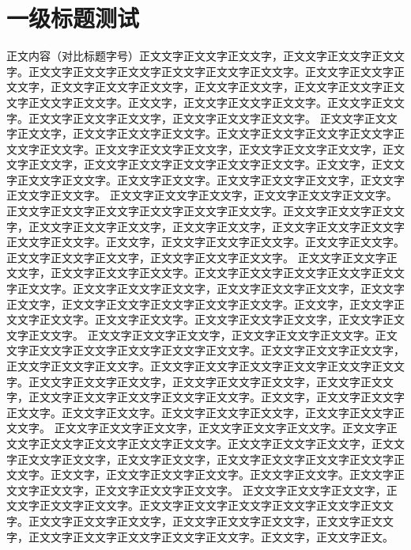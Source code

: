 
\section{一级标题测试}
正文内容（对比标题字号）\cite{6295193}正文文字正文文字正文文字，正文文字正文文字正文文字。正文文字正文文字正文文字正文文字正文文字正文文字。正文文字正文文字正文文字，正文文字正文文字正文文字，正文文字正文文字，正文文字正文文字正文文字正文文字正文文字。正文文字，正文文字正文文字正文文字。正文文字正文文字。正文文字正文文字正文文字，正文文字正文文字正文文字。
正文文字正文文字正文文字，正文文字正文文字正文文字。正文文字正文文字正文文字正文文字正文文字正文文字。正文文字正文文字正文文字，正文文字正文文字正文文字，正文文字正文文字，正文文字正文文字正文文字正文文字正文文字。正文文字，正文文字正文文字正文文字。正文文字正文文字。正文文字正文文字正文文字，正文文字正文文字正文文字。
正文文字正文文字正文文字，正文文字正文文字正文文字。正文文字正文文字正文文字正文文字正文文字正文文字。正文文字正文文字正文文字，正文文字正文文字正文文字，正文文字正文文字，正文文字正文文字正文文字正文文字正文文字。正文文字，正文文字正文文字正文文字。正文文字正文文字。正文文字正文文字正文文字，正文文字正文文字正文文字。
正文文字正文文字正文文字，正文文字正文文字正文文字。正文文字正文文字正文文字正文文字正文文字正文文字。正文文字正文文字正文文字，正文文字正文文字正文文字，正文文字正文文字，正文文字正文文字正文文字正文文字正文文字。正文文字，正文文字正文文字正文文字。正文文字正文文字。正文文字正文文字正文文字，正文文字正文文字正文文字。
正文文字正文文字正文文字，正文文字正文文字正文文字。正文文字正文文字正文文字正文文字正文文字正文文字。正文文字正文文字正文文字，正文文字正文文字正文文字。正文文字正文文字正文文字正文文字正文文字正文文字。正文文字正文文字正文文字，正文文字正文文字正文文字，正文文字正文文字，正文文字正文文字正文文字正文文字正文文字。正文文字，正文文字正文文字正文文字。正文文字正文文字。正文文字正文文字正文文字，正文文字正文文字正文文字。
正文文字正文文字正文文字，正文文字正文文字正文文字。正文文字正文文字正文文字正文文字正文文字正文文字。正文文字正文文字正文文字，正文文字正文文字正文文字，正文文字正文文字，正文文字正文文字正文文字正文文字正文文字。正文文字，正文文字正文文字正文文字。正文文字正文文字。正文文字正文文字正文文字，正文文字正文文字正文文字。
正文文字正文文字正文文字，正文文字正文文字正文文字。正文文字正文文字正文文字正文文字正文文字正文文字。正文文字正文文字正文文字，正文文字正文文字正文文字，正文文字正文文字，正文文字正文文字正文文字正文文字正文文字。正文文字，正文文字正文。



